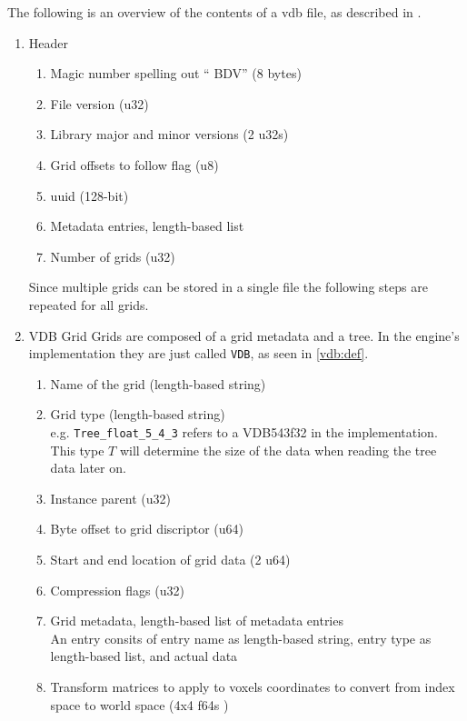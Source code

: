 The following is an overview of the contents of a vdb file, as described in \cite{vdbfile}.


\begin{enumerate}
  \item Header
        \begin{enumerate}
          \item Magic number spelling out `` BDV'' (8 bytes)
          \item File version (u32)
          \item Library major and minor versions (2 u32s)
          \item Grid offsets to follow flag (u8)
          \item \acrshort{uuid} (128-bit)
          \item Metadata entries, length-based list
          \item Number of grids (u32)
        \end{enumerate}
        Since multiple grids can be stored in a single file the following steps are repeated for all grids.
  \item VDB Grid
        Grids are composed of a grid metadata and a tree. In the engine's implementation they are just called \verb|VDB|, as seen in \cref{vdb:def}.
        \begin{enumerate}
          \item Name of the grid (length-based string)
          \item Grid type (length-based string) \\
                e.g. \verb|Tree_float_5_4_3| refers to a VDB543\<f32\> in the implementation.
                This type $T$ will determine the size of the data when reading the tree data later on.
          \item Instance parent (u32)
          \item Byte offset to grid discriptor (u64)
          \item Start and end location of grid data (2 u64)
          \item Compression flags (u32)
          \item\label{file:meta} Grid metadata, length-based list of metadata entries \\
                An entry consits of entry name as length-based string, entry type as length-based list, and actual data
          \item Transform matrices to apply to voxels coordinates to convert from index space to world space (4x4 f64s )

\end{enumerate}
\end{enumerate}
